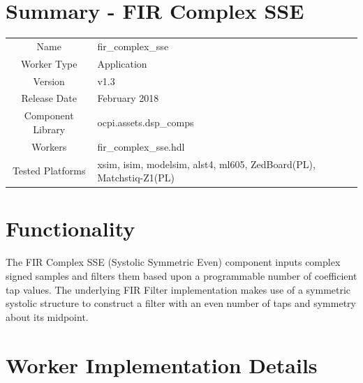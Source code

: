 \documentclass{article}
\author{} %
\date{Version \docVersion} %
\title{\docTitle}
\def\docVersion{1.3}
\def\comp{fir\_complex\_sse}
\def\Comp{FIR Complex SSE}
\begin{document}
\section*{Summary - \Comp}
\begin{tabular}{|c|M{13.5cm}|}
	\hline
	                  &                                                              \\
	\hline
	Name              & \comp                                                        \\
	\hline
	Worker Type       & Application                                                  \\
	\hline
	Version           & v\docVersion \\
	\hline
	Release Date      & February 2018 \\
	\hline
	Component Library & ocpi.assets.dsp\_comps                                        \\
	\hline
	Workers           & \comp.hdl                                                    \\
	\hline
	Tested Platforms  & xsim, isim, modelsim, alst4, ml605, ZedBoard(PL), Matchstiq-Z1(PL) \\
	\hline
\end{tabular}

\section*{Functionality}
\begin{flushleft}
	The FIR Complex SSE (Systolic Symmetric Even) component inputs complex signed samples and filters them based upon a programmable number of coefficient tap values. The underlying FIR Filter implementation makes use of a symmetric systolic structure to construct a filter with an even number of taps and symmetry about its midpoint.
\end{flushleft}

\section*{Worker Implementation Details}
\end{document}
